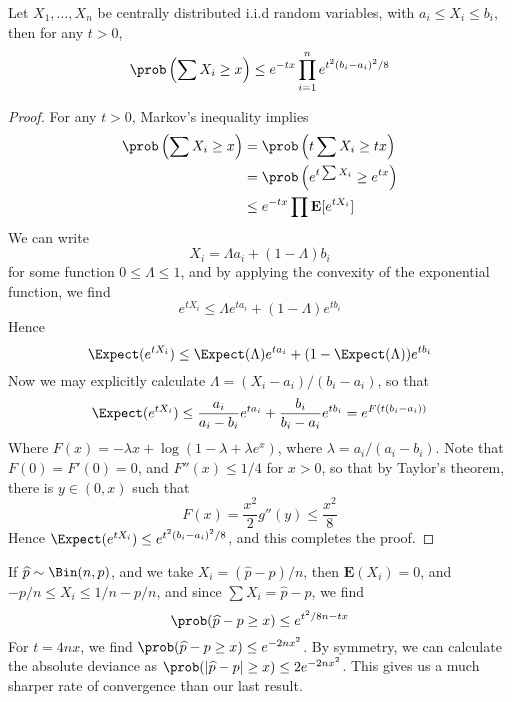 \begin{theorem}
    Let $X_1, \dots, X_n$ be centrally distributed i.i.d random variables, with $a_i \leq X_i \leq b_i$, then for any $t > 0$,
    \[ \prob \left( \sum X_i \geq x \right) \leq e^{-tx} \prod_{i = 1}^n e^{t^2 (b_i - a_i)^2/8} \]
\end{theorem}
\begin{proof}
    For any $t > 0$, Markov's inequality implies
    \begin{align*}
        \prob \left( \sum X_i \geq x \right) &= \prob \left( t \sum X_i \geq tx \right)\\
        &= \prob \left( e^{t \sum X_i} \geq e^{tx} \right)\\
        &\leq e^{-tx} \prod \mathbf{E}[e^{t X_i}]
    \end{align*}
    We can write
    \[ X_i = \Lambda a_i + (1 - \Lambda) b_i \]
    for some function $0 \leq \Lambda \leq 1$, and by applying the convexity of the exponential function, we find
    \[ e^{tX_i} \leq \Lambda e^{t a_i} + (1 - \Lambda) e^{t b_i} \]
    Hence
    \[ \Expect(e^{tX_i}) \leq \Expect(\Lambda) e^{t a_i} + (1 - \Expect(\Lambda)) e^{t b_i} \]
    Now we may explicitly calculate $\Lambda = (X_i - a_i)/(b_i - a_i)$, so that
    \[ \Expect(e^{tX_i}) \leq \frac{a_i}{a_i - b_i} e^{t a_i} + \frac{b_i}{b_i - a_i} e^{t b_i} = e^{F(t(b_i - a_i))} \]
    Where $F(x) = - \lambda x + \log(1 - \lambda + \lambda e^x)$, where $\lambda = a_i/(a_i - b_i)$. Note that $F(0) = F'(0) = 0$, and $F''(x) \leq 1/4$ for $x > 0$, so that by Taylor's theorem, there is $y \in (0,x)$ such that
    \[ F(x) = \frac{x^2}{2} g''(y) \leq \frac{x^2}{8} \]
    Hence $\Expect(e^{tX_i}) \leq e^{t^2(b_i - a_i)^2/8}$, and this completes the proof.
\end{proof}

\begin{example}
    If $\widehat{p} \sim \Bin(n,p)$, and we take $X_i = (\widehat{p} - p)/n$, then $\mathbf{E}(X_i) = 0$, and $-p/n \leq X_i \leq 1/n-p/n$, and since $\sum X_i = \widehat{p} - p$, we find
    \[ \prob(\widehat{p} - p \geq x) \leq e^{t^2/8n - tx} \]
    For $t = 4nx$, we find $\prob(\widehat{p} - p \geq x) \leq e^{-2nx^2}$. By symmetry, we can calculate the absolute deviance as $\prob(|\widehat{p} - p| \geq x) \leq 2e^{-2nx^2}$. This gives us a much sharper rate of convergence than our last result.
\end{example}

